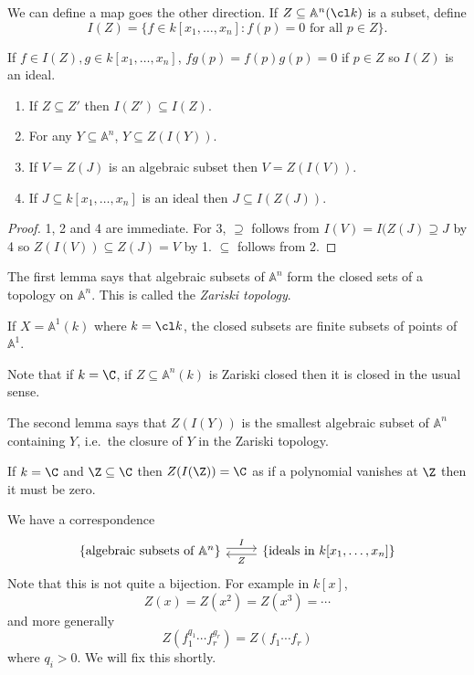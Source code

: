 \documentclass[a4paper]{article}
\renewcommand{\A}{\mathbb{A}}
\begin{document}
We can define a map goes the other direction. If \(Z \subseteq \A^n(\cl k)\) is a subset, define
\[
  I(Z) = \{f \in k[x_1, \dots, x_n]: f(p) = 0 \text{ for all } p \in Z\}.
\]

If \(f \in I(Z), g \in k[x_1, \dots, x_n]\), \(fg(p) = f(p)g(p) = 0\) if \(p \in Z\) so \(I(Z)\) is an ideal.

\begin{lemma}\leavevmode
  \begin{enumerate}
  \item If \(Z \subseteq Z'\) then \(I(Z') \subseteq I(Z)\).
  \item For any \(Y \subseteq \A^n\), \(Y \subseteq Z(I(Y))\).
  \item If \(V = Z(J)\) is an algebraic subset then \(V = Z(I(V))\).
  \item If \(J \subseteq k[x_1, \dots, x_n]\) is an ideal then \(J \subseteq I(Z(J))\).
  \end{enumerate}
\end{lemma}

\begin{proof}
  1, 2 and 4 are immediate. For 3, \(\supseteq\) follows from \(I(V) = I(Z(J) \supseteq J\) by 4 so \(Z(I(V)) \subseteq Z(J) = V\) by 1. \(\subseteq\) follows from 2.
\end{proof}

The first lemma says that algebraic subsets of \(\A^n\) form the closed sets of a topology on \(\A^n\). This is called the \emph{Zariski topology}.

\begin{eg}
  If \(X = \A^1(k)\) where \(k = \cl k\), the closed subsets are finite subsets of points of \(\A^1\).

  Note that if \(k = \C\), if \(Z \subseteq \A^n(k)\) is Zariski closed then it is closed in the usual sense.
\end{eg}

The second lemma says that \(Z(I(Y))\) is the smallest algebraic subset of \(\A^n\) containing \(Y\), i.e.\ the closure of \(Y\) in the Zariski topology.

\begin{eg}
  If \(k = \C\) and \(\Z \subseteq \C\) then \(Z(I(\Z)) = \C\) as if a polynomial vanishes at \(\Z\) then it must be zero.
\end{eg}

We have a correspondence
\[
  \begin{tikzcd}
    \{\text{algebraic subsets of } \A^n\} \ar[r, "I", shift left] & \{\text{ideals in } k[x_1, \dots, x_n]\} \ar[l, "Z", shift left]
  \end{tikzcd}
\]
Note that this is not quite a bijection. For example in \(k[x]\),
\[
  Z(x) = Z(x^2) = Z(x^3) = \cdots
\]
and more generally
\[
  Z(f_1^{q_1} \cdots f_r^{g_r}) = Z(f_1 \cdots f_r)
\]
where \(q_i > 0\). We will fix this shortly.
\end{document}
